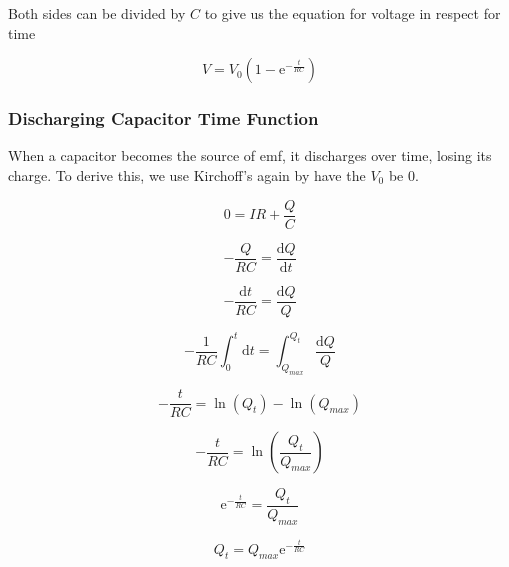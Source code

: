 \documentclass[a4paper,12pt]{article}
\begin{document}
						Both sides can be divided by $C$ to give us the equation for voltage in respect for time

						\begin{equation*}
								V = V_{0}\left(1-\mathrm{e}^{-\frac{t}{RC}}\right)
						\end{equation*}
						

					\subsubsection{Discharging Capacitor Time Function}
						When a capacitor becomes the source of emf, it discharges over time, losing its charge. To derive this, we use Kirchoff's again by have the $V_{0}$ be 0.

						\begin{equation*}
								0 = IR + \frac{Q}{C}
						\end{equation*}

						\begin{equation*}
								-\frac{Q}{RC} = \frac{\mathrm{d}Q}{\mathrm{d}t} 
						\end{equation*}

						\begin{equation*}
								-\frac{\mathrm{d}t}{RC} = \frac{\mathrm{d}Q}{Q} 
						\end{equation*}

						\begin{equation*}
								-\frac{1}{RC}\int_{0}^{t} \mathrm{d}t = \int_{Q_{max}}^{Q_{t}} \frac{\mathrm{d}Q}{Q}
						\end{equation*}

						\begin{equation*}
								-\frac{t}{RC} = \ln\left( Q_{t} \right) - \ln\left( Q_{max}\right)
						\end{equation*}

						\begin{equation*}
								-\frac{t}{RC} = \ln\left( \frac{Q_{t}}{Q_{max}} \right)
						\end{equation*}

						\begin{equation*}
								\mathrm{e}^{-\frac{t}{RC}} = \frac{Q_{t}}{Q_{max}}
						\end{equation*}

						\begin{equation*}
								Q_{t} =	Q_{max}	\mathrm{e}^{-\frac{t}{RC}}
						\end{equation*}
\end{document}
